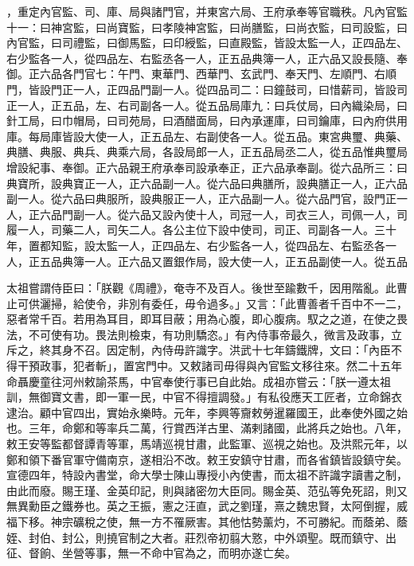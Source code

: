 ，重定內官監、司、庫、局與諸門官，并東宮六局、王府承奉等官職秩。凡內官監十一：曰神宮監，曰尚寶監，曰孝陵神宮監，曰尚膳監，曰尚衣監，曰司設監，曰內官監，曰司禮監，曰御馬監，曰印綬監，曰直殿監，皆設太監一人，正四品左、右少監各一人，從四品左、右監丞各一人，正五品典簿一人，正六品又設長隨、奉御。正六品各門官七：午門、東華門、西華門、玄武門、奉天門、左順門、右順門，皆設門正一人，正四品門副一人。從四品司二：曰鐘鼓司，曰惜薪司，皆設司正一人，正五品，左、右司副各一人。從五品局庫九：曰兵仗局，曰內織染局，曰針工局，曰巾帽局，曰司苑局，曰酒醋面局，曰內承運庫，曰司鑰庫，曰內府供用庫。每局庫皆設大使一人，正五品左、右副使各一人。從五品。東宮典璽、典藥、典膳、典服、典兵、典乘六局，各設局郎一人，正五品局丞二人，從五品惟典璽局增設紀事、奉御。正六品親王府承奉司設承奉正，正六品承奉副。從六品所三：曰典寶所，設典寶正一人，正六品副一人。從六品曰典膳所，設典膳正一人，正六品副一人。從六品曰典服所，設典服正一人，正六品副一人。從六品門官，設門正一人，正六品門副一人。從六品又設內使十人，司冠一人，司衣三人，司佩一人，司履一人，司藥二人，司矢二人。各公主位下設中使司，司正、司副各一人。三十年，置都知監，設太監一人，正四品左、右少監各一人，從四品左、右監丞各一人，正五品典簿一人。正六品又置銀作局，設大使一人，正五品副使一人。從五品

太祖嘗謂侍臣曰：「朕觀《周禮》，奄寺不及百人。後世至踰數千，因用階亂。此曹止可供灑掃，給使令，非別有委任，毋令過多。」又言：「此曹善者千百中不一二，惡者常千百。若用為耳目，即耳目蔽；用為心腹，即心腹病。馭之之道，在使之畏法，不可使有功。畏法則檢束，有功則驕恣。」有內侍事帝最久，微言及政事，立斥之，終其身不召。因定制，內侍毋許識字。洪武十七年鑄鐵牌，文曰：「內臣不得干預政事，犯者斬」，置宮門中。又敕諸司毋得與內官監文移往來。然二十五年命聶慶童往河州敕諭茶馬，中官奉使行事已自此始。成祖亦嘗云：「朕一遵太祖訓，無御寶文書，即一軍一民，中官不得擅調發。」有私役應天工匠者，立命錦衣逮治。顧中官四出，實始永樂時。元年，李興等齎敕勞暹羅國王，此奉使外國之始也。三年，命鄭和等率兵二萬，行賞西洋古里、滿剌諸國，此將兵之始也。八年，敕王安等監都督譚青等軍，馬靖巡視甘肅，此監軍、巡視之始也。及洪熙元年，以鄭和領下番官軍守備南京，遂相沿不改。敕王安鎮守甘肅，而各省鎮皆設鎮守矣。宣德四年，特設內書堂，命大學士陳山專授小內使書，而太祖不許識字讀書之制，由此而廢。賜王瑾、金英印記，則與諸密勿大臣同。賜金英、范弘等免死詔，則又無異勳臣之鐵券也。英之王振，憲之汪直，武之劉瑾，熹之魏忠賢，太阿倒握，威福下移。神宗礦稅之使，無一方不罹厥害。其他怙勢薰灼，不可勝紀。而蔭弟、蔭姪、封伯、封公，則撓官制之大者。莊烈帝初翦大憝，中外頌聖。既而鎮守、出征、督餉、坐營等事，無一不命中官為之，而明亦遂亡矣。

